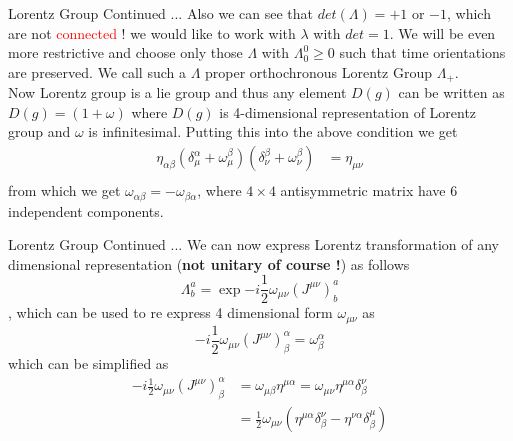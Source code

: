 \documentclass{beamer}
\begin{document}
\begin{frame}{Lorentz Group Continued ...}
    Also we can see that $det(\Lambda)= +1$ or $-1$, which are not \textcolor{red}{connected} ! we would like to work with $\lambda$ with $det = 1$. We will be even more restrictive and choose only those $\Lambda$ with $\Lambda^{0}_{0} \geq 0$ such that time orientations are preserved. We call such a $\Lambda$ proper orthochronous Lorentz Group $\Lambda_{+}$. \\
    \vspace{5mm}
    Now Lorentz group is a lie group and thus any element $D(g)$ can be written as $D(g) = (1 + \omega)$ where $D(g)$ is 4-dimensional representation of Lorentz group and $\omega$ is infinitesimal. Putting this into the above condition we get 
    \begin{align}
        \eta_{\alpha\beta}(\delta^{\alpha}_{\mu} + \omega^{\beta}_{\mu})(\delta^{\beta}_{\nu} + \omega^{\beta}_{\nu}) &= \eta_{\mu\nu} \\
    \end{align} from which we get $\omega_{\alpha\beta} = -\omega_{\beta\alpha}$, where $4\times 4$ antisymmetric matrix have 6 independent components.
\end{frame}
\begin{frame}{Lorentz Group Continued ...}
We can now express Lorentz transformation of any dimensional representation (\textbf{not unitary of course !}) as follows
\begin{equation}
    \Lambda^{a}_{b} = \exp{-i\frac{1}{2}\omega_{\mu\nu}(J^{\mu\nu})^{a}_{b}}
\end{equation}, which can be used to re express 4 dimensional form $\omega_{\mu\nu}$ as 
\begin{equation}
    -i \frac{1}{2}\omega_{\mu\nu}(J^{\mu\nu})^{\alpha}_{\beta} = \omega^{\alpha}_{\beta}
\end{equation} which can be simplified as 
\begin{align}
    -i\frac{1}{2}\omega_{\mu\nu}(J^{\mu\nu})^{\alpha}_{\beta} &= \omega_{\mu\beta}\eta^{\mu\alpha} = \omega_{\mu\nu}\eta^{\mu\alpha}\delta^{\nu}_{\beta} \\
                                                              &= \frac{1}{2}\omega_{\mu\nu}(\eta^{\mu\alpha}\delta^{\nu}_{\beta} - \eta^{\nu\alpha}\delta^{\mu}_{\beta})
\end{align}
\end{frame} 
\end{document}
